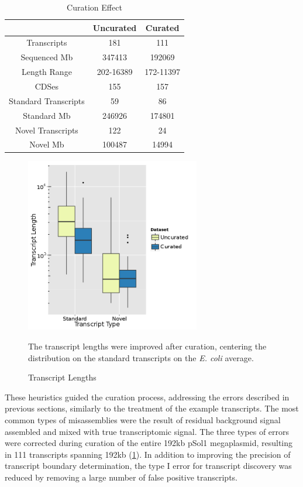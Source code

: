 \begin{table}
\caption{Curation Effect}\label{table:assemb_curation}
\begin{center}
\begin{tabular}{|c|c|c|}\hline
  & Uncurated & Curated\\\hline\hline
Transcripts & 181 & 111\\\hline
Sequenced Mb & 347413 & 192069\\\hline
Length Range & 202-16389 & 172-11397\\\hline
CDSes & 155 & 157\\\hline
Standard Transcripts & 59 & 86\\\hline
Standard Mb & 246926 & 174801\\\hline
Novel Transcripts & 122 & 24\\\hline
Novel Mb & 100487 & 14994\\\hline
\end{tabular}
\end{center}
\end{table}

\begin{figure}
\small
\vspace{-20pt}
\begin{center}
\includegraphics[width=\linewidth,height=3in]{images/Assembly/Curation/PairvsCuration_length.png}
\end{center}
\vspace{-20pt}
\caption{Transcript Lengths}\label{fig:5.20}
The transcript lengths were improved after curation, centering the distribution on the standard transcripts on the \textit{E. coli} average\cite{86}.
\end{figure}

These heuristics guided the curation process, addressing the errors described in previous sections, similarly to the treatment of the example transcripts. The most common types of misassemblies were the result of residual background signal assembled and mixed with true transcriptomic signal. The three types of errors were corrected during curation of the entire 192kb pSol1 megaplasmid, resulting in 111 transcripts spanning 192kb (\ref{table:assemb_curation}). In addition to improving the precision of transcript boundary determination, the type I error for transcript discovery was reduced by removing a large number of false positive transcripts.

